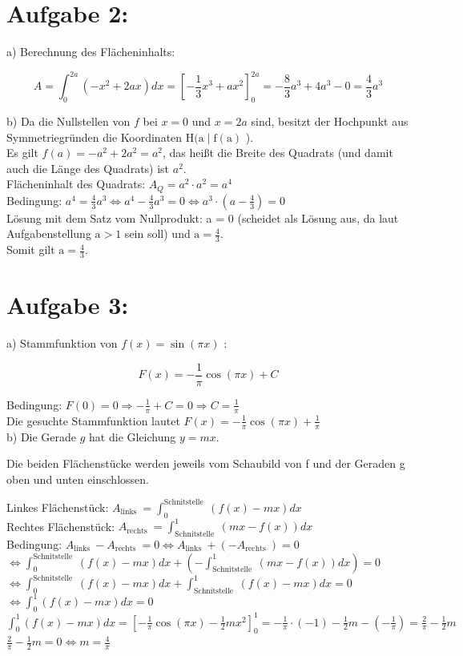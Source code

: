 \documentclass[10pt]{article}
\begin{document}
\section*{Aufgabe 2:}
a) Berechnung des Flächeninhalts:

$$
A=\int_{0}^{2 a}\left(-x^{2}+2 a x\right) d x=\left[-\frac{1}{3} x^{3}+a x^{2}\right]_{0}^{2 a}=-\frac{8}{3} a^{3}+4 a^{3}-0=\frac{4}{3} a^{3}
$$

b) Da die Nullstellen von $f$ bei $x=0$ und $x=2 a$ sind, besitzt der Hochpunkt aus Symmetriegründen die Koordinaten $\mathrm{H}(\mathrm{a} \mid \mathrm{f}(\mathrm{a})$ ).\\
Es gilt $f(a)=-a^{2}+2 a^{2}=a^{2}$, das heißt die Breite des Quadrats (und damit auch die Länge des Quadrats) ist $a^{2}$.\\
Flächeninhalt des Quadrats: $A_{Q}=a^{2} \cdot a^{2}=a^{4}$\\
Bedingung: $a^{4}=\frac{4}{3} a^{3} \Leftrightarrow a^{4}-\frac{4}{3} a^{3}=0 \Leftrightarrow a^{3} \cdot\left(a-\frac{4}{3}\right)=0$\\
Lösung mit dem Satz vom Nullprodukt: a = 0 (scheidet als Lösung aus, da laut Aufgabenstellung $\mathrm{a}>1$ sein soll) und $\mathrm{a}=\frac{4}{3}$.\\
Somit gilt $\mathrm{a}=\frac{4}{3}$.

\section*{Aufgabe 3:}
a) Stammfunktion von $f(x)=\sin (\pi x)$ :

$$
F(x)=-\frac{1}{\pi} \cos (\pi x)+C
$$

Bedingung: $F(0)=0 \Rightarrow-\frac{1}{\pi}+C=0 \Rightarrow C=\frac{1}{\pi}$\\
Die gesuchte Stammfunktion lautet $F(x)=-\frac{1}{\pi} \cos (\pi x)+\frac{1}{\pi}$\\
b) Die Gerade $g$ hat die Gleichung $y=m x$.

Die beiden Flächenstücke werden jeweils vom Schaubild von f und der Geraden g oben und unten einschlossen.

Linkes Flächenstück: $A_{\text {links }}=\int_{0}^{\text {Schnitstelle }}(f(x)-m x) d x$\\
Rechtes Flächenstück: $A_{\text {rechts }}=\int_{\text {Schnitstelle }}^{1}(m x-f(x)) d x$\\
Bedingung: $A_{\text {links }}-A_{\text {rechts }}=0 \Leftrightarrow A_{\text {links }}+\left(-A_{\text {rechts }}\right)=0$\\
$\Leftrightarrow \int_{0}^{\text {Schnitstelle }}(f(x)-m x) d x+\left(-\int_{\text {Schnitstelle }}^{1}(m x-f(x)) d x\right)=0$\\
$\Leftrightarrow \int_{0}^{\text {Schnitstelle }}(f(x)-m x) d x+\int_{\text {Schnitstelle }}^{1}(f(x)-m x) d x=0$\\
$\Leftrightarrow \int_{0}^{1}(f(x)-m x) d x=0$\\
$\int_{0}^{1}(f(x)-m x) d x=\left[-\frac{1}{\pi} \cos (\pi x)-\frac{1}{2} m x^{2}\right]_{0}^{1}=-\frac{1}{\pi} \cdot(-1)-\frac{1}{2} m-\left(-\frac{1}{\pi}\right)=\frac{2}{\pi}-\frac{1}{2} m$\\
$\frac{2}{\pi}-\frac{1}{2} m=0 \Leftrightarrow m=\frac{4}{\pi}$
\end{document}
